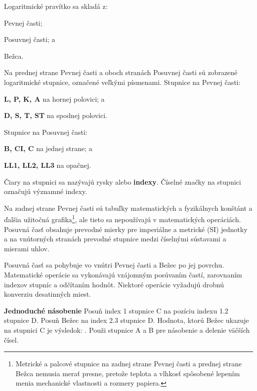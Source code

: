   \begin{multicols*}{3}
  \normalsize{
  Logaritmické pravítko sa skladá z:
    \begin{inparaenum}[a\upshape)]
      \item Pevnej časti;
      \item Posuvnej časti; a
      \item Bežca.
    \end{inparaenum}

  Na prednej strane Pevnej časti a oboch stranách Posuvnej časti sú zobrazené logaritmické stupnice, označené veľkými písmenami. Stupnice na Pevnej časti:
  \begin{inparaenum}[a\upshape)]
    \item \textbf{L, P, K, A} na hornej polovici; a
    \item \textbf{D, S, T, ST} na spodnej polovici.
  \end{inparaenum}
  Stupnice na Posuvnej časti:
  \begin{inparaenum}[a\upshape)]
    \item \textbf{B, CI, C} na jednej strane; a
    \item \textbf{LL1, LL2, LL3} na opačnej.
  \end{inparaenum}

  Čiary na stupnici sa nazývajú rysky alebo \textbf{indexy}. Číselné značky na stupnici označujú významné indexy.

  Na zadnej strane Pevnej časti sú tabuľky matematických a fyzikálnych konštánt a ďalšia užitočná grafika\footnote{Metrické a palcové stupnice na zadnej strane Pevnej časti a prednej strane Bežca nemusia merať presne, pretože teplota a vlhkosť spôsobené lepením menia mechanické vlastnosti a rozmery papiera.}, ale tieto sa nepoužívajú v matematických operáciách. Posuvná časť obsahuje prevodné mierky pre imperiálne a metrické (SI) jednotky a na vnútorných stranách prevodné stupnice medzi číselnými sústavami a mierami uhlov.

  Posuvná časť sa pohybuje vo vnútri Pevnej časti a Bežec po jej povrchu. Matematické operácie sa vykonávajú vzájomným posúvaním častí, zarovnaním indexov stupníc a odčítaním hodnôt. Niektoré operácie vyžadujú drobnú konverziu desatinných miest.

  \textbf{Jednoduché násobenie}
Posuň index 1 stupnice C na pozíciu indexu 1.2 stupnice D.
Posuň Bežec na index 2.3 stupnice D.
Hodnota, ktorú Bežec ukazuje na stupnici C je výsledok: .
\footnotesize Použi stupnice A a B pre násobenie a delenie väčších čísel.
\normalsize

}
\end{multicols*}

